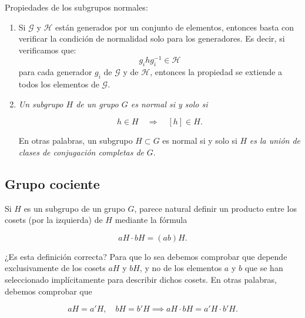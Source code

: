 \documentclass{report}
\begin{document}
\vspace{.2cm}
Propiedades de los subgrupos normales:
\begin{enumerate}
\item
Si \( \mathcal{G} \) y \( \mathcal{H} \) están generados por un conjunto de elementos, entonces basta con verificar la condición de normalidad solo para los generadores.  
Es decir, si verificamos que:
\[
g_i h g_i^{-1} \in \mathcal{H}
\]
para cada generador \( g_i \) de \( \mathcal{G} \) y  de \( \mathcal{H} \), entonces la propiedad se extiende a todos los elementos de \( \mathcal{G} \).

\item \textit{Un subgrupo \( H \) de un grupo \( G \) es normal si y solo si}

\[
h \in H \quad \Longrightarrow \quad [h] \in H.
\]

En otras palabras, un subgrupo \( H \subset G \) es normal si y solo si \( H \) \textit{es la unión de clases de conjugación completas de} \( G \). 



\end{enumerate}























\subsection{Grupo cociente}

Si \( H \) es un subgrupo de un grupo \( G \), parece natural definir un producto entre los cosets (por la izquierda) de \( H \) mediante la fórmula

\[
aH \cdot bH = (ab)H.
\]



¿Es esta definición correcta? Para que lo sea debemos comprobar que depende exclusivamente de los cosets \( aH \) y \( bH \), y no de los elementos \( a \) y \( b \) que se han seleccionado implícitamente para describir dichos cosets. En otras palabras, debemos comprobar que

\[
aH = a'H , \quad bH = b'H \implies aH \cdot bH = a'H \cdot b'H.
\]
\end{document}
